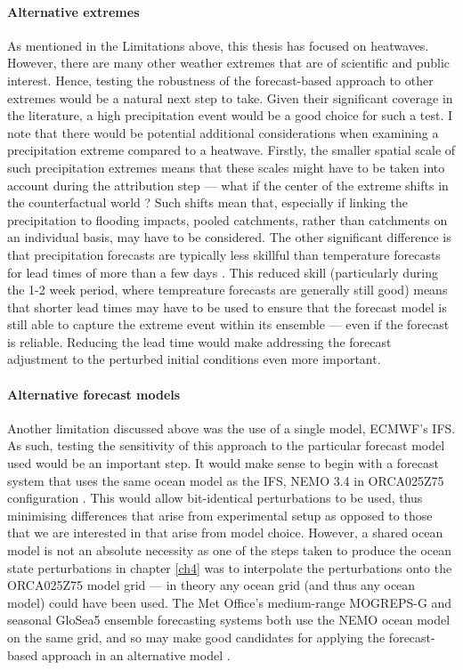     \paragraph*{Alternative extremes}

      As mentioned in the Limitations above, this thesis has focused on heatwaves. However, there are many other weather extremes that are of scientific and public interest. Hence, testing the robustness of the forecast-based approach to other extremes would be a natural next step to take. Given their significant coverage in the literature, a high precipitation event would be a good choice for such a test. I note that there would be potential additional considerations when examining a precipitation extreme compared to a heatwave. Firstly, the smaller spatial scale of such precipitation extremes means that these scales might have to be taken into account during the attribution step --- what if the center of the extreme shifts in the counterfactual world \citep{schaller_role_2020}? Such shifts mean that, especially if linking the precipitation to flooding impacts, pooled catchments, rather than catchments on an individual basis, may have to be considered. The other significant difference is that precipitation forecasts are typically less skillful than temperature forecasts for lead times of more than a few days \citep{rodwell_medium-range_2006,vitart_evolution_2014,swinbank_tigge_2016,monhart_skill_2018,mishra_multi-model_2019,haiden_evaluation_2021}. This reduced skill (particularly during the 1-2 week period, where tempreature forecasts are generally still good) means that shorter lead times may have to be used to ensure that the forecast model is still able to capture the extreme event within its ensemble --- even if the forecast is reliable. Reducing the lead time would make addressing the forecast adjustment to the perturbed initial conditions even more important.

    \paragraph*{Alternative forecast models}

      Another limitation discussed above was the use of a single model, ECMWF's IFS. As such, testing the sensitivity of this approach to the particular forecast model used would be an important step. It would make sense to begin with a forecast system that uses the same ocean model as the IFS, NEMO 3.4 in ORCA025Z75 configuration \citep{madec_nemo_2008}. This would allow bit-identical perturbations to be used, thus minimising differences that arise from experimental setup as opposed to those that we are interested in that arise from model choice. However, a shared ocean model is not an absolute necessity as one of the steps taken to produce the ocean state perturbations in chapter \ref{ch4} was to interpolate the perturbations onto the ORCA025Z75 model grid --- in theory any ocean grid (and thus any ocean model) could have been used. The Met Office's medium-range MOGREPS-G and seasonal GloSea5 ensemble forecasting systems both use the NEMO ocean model on the same grid, and so may make good candidates for applying the forecast-based approach in an alternative model \citep{maclachlan_global_2015}.

